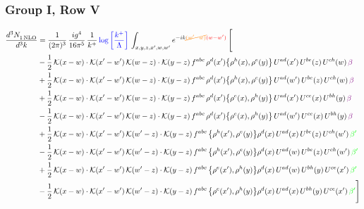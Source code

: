\documentclass[9pt]{article}
\numberwithin{equation}{section}
\begin{document}
\subsubsection{Group I, Row V}
\begin{align}
    \frac{d^{3}N_{1\,\rm NLO}^{\rm}}{d^{3}k}  & = \frac{1}{(2\pi)^{3}}\, \frac{ig^{4}}{16\pi^{5}}\, \frac{1}{k^{+}}\, {\color{blue}\log{\left[\frac{k^{+}}{\Lambda}\right]}}\,\int_{x,y,z,x^{\prime},w,w^{\prime}}e^{-ik{\color{orange}\cancel{(w^{\prime}-w)}}{\color{red}(w-w^{\prime})}}\, \Bigg[\notag \\ & -\frac{1}{2}\,\mathcal{K}(x-w)\cdot\mathcal{K}(x'-w')\,\mathcal{K}(w-z)\cdot\mathcal{K}(y-z)\, f^{abc}\,\rho^{d}(x')\big\{\rho^{h}(x),\rho^{e}(y)\big\}\,U^{ad}(x')\,U^{be}(z)\,U^{ch}(w)\,{\color{violet} \beta}\notag\\ & +\frac{1}{2}\,\mathcal{K}(x-w)\cdot\mathcal{K}(x'-w')\,\mathcal{K}(w-z)\cdot\mathcal{K}(y-z)\, f^{abc}\,\rho^{d}(x')\big\{\rho^{h}(x),\rho^{e}(y)\big\}\,U^{ad}(w')\,U^{be}(z)\,U^{ch}(w)\,{\color{violet} \beta}\notag\\ &+\frac{1}{2}\,\mathcal{K}(x-w)\cdot\mathcal{K}(x'-w')\,\mathcal{K}(w-z)\cdot\mathcal{K}(y-z)\, f^{abc}\,\rho^{d}(x')\big\{\rho^{e}(x),\rho^{h}(y)\big\}\,U^{ad}(x')\,U^{ce}(x)\,U^{bh}(y)\,{\color{violet} \beta}\notag\\ & -\frac{1}{2}\,\mathcal{K}(x-w)\cdot\mathcal{K}(x'-w')\,\mathcal{K}(w-z)\cdot\mathcal{K}(y-z)\, f^{abc}\,\rho^{d}(x')\big\{\rho^{e}(x),\rho^{h}(y)\big\}\,U^{ad}(w')\,U^{ce}(x)\,U^{bh}(y)\,{\color{violet} \beta}\notag\\ & +\frac{1}{2}\,\mathcal{K}(x-w)\cdot\mathcal{K}(x'-w')\,\mathcal{K}(w'-z)\cdot\mathcal{K}(y-z)\, f^{abc}\,\big\{\rho^{h}(x'),\rho^{e}(y)\big\}\rho^{d}(x)\,U^{ad}(x)\,U^{be}(z)\,U^{ch}(w')\,{\color{green} \beta'}\notag\\ &-\frac{1}{2}\,\mathcal{K}(x-w)\cdot\mathcal{K}(x'-w')\,\mathcal{K}(w'-z)\cdot\mathcal{K}(y-z)\, f^{abc}\,\big\{\rho^{h}(x'),\rho^{e}(y)\big\}\rho^{d}(x)\,U^{ad}(w)\,U^{be}(z)\,U^{ch}(w')\,{\color{green} \beta'}\notag\\ & +\frac{1}{2}\,\mathcal{K}(x-w)\cdot\mathcal{K}(x'-w')\,\mathcal{K}(w'-z)\cdot\mathcal{K}(y-z)\, f^{abc}\,\big\{\rho^{e}(x'),\rho^{h}(y)\big\}\rho^{d}(x)\,U^{ad}(w)\,U^{bh}(y)\,U^{ce}(x')\,{\color{green} \beta'}\notag\\ &-\frac{1}{2}\,\mathcal{K}(x-w)\cdot\mathcal{K}(x'-w')\,\mathcal{K}(w'-z)\cdot\mathcal{K}(y-z)\, f^{abc}\,\big\{\rho^{e}(x'),\rho^{h}(y)\big\}\rho^{d}(x)\,U^{ad}(x)\,U^{bh}(y)\,U^{ce}(x')\,{\color{green} \beta'} \Bigg]
\end{align}
\end{document}
